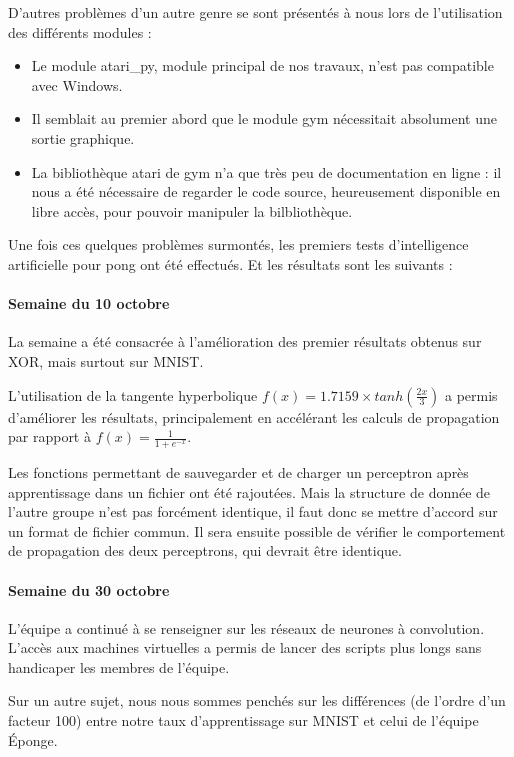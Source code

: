 \documentclass[
    10pt,
    a4paper,
    oneside,
    headinclude,footinclude,
    BCOR=5mm,
    captions=tableabove
]{scrartcl}
\begin{document}
D'autres problèmes d'un autre genre se sont présentés à nous lors de l'utilisation des différents modules :
\begin{itemize}
	\item Le module atari\_py, module principal de nos travaux, n'est pas compatible avec Windows.
	\item Il semblait au premier abord que le module gym nécessitait absolument une sortie graphique.
	\item La bibliothèque atari de gym n'a que très peu de documentation en ligne : il nous a été nécessaire de regarder le code source, heureusement disponible en libre accès, pour pouvoir manipuler la bilbliothèque.
\end{itemize}

	
Une fois ces quelques problèmes surmontés, les premiers tests d'intelligence artificielle pour pong ont été effectués. Et les résultats sont les suivants :

\paragraph{Semaine du 10 octobre}

La semaine a été consacrée à l'amélioration des premier résultats obtenus sur XOR, mais surtout sur MNIST.

L'utilisation de la tangente hyperbolique $f(x) = 1.7159 \times tanh(\frac{2x}{3})$ a permis d'améliorer les résultats, principalement en accélérant les calculs de propagation par rapport à $f(x) = \frac{1}{1 + e^{-x}}$.

Les fonctions permettant de sauvegarder et de charger un perceptron après apprentissage dans un fichier ont été rajoutées. Mais la structure de donnée de l'autre groupe n'est pas forcément identique, il faut donc se mettre d'accord sur un format de fichier commun. Il sera ensuite possible de vérifier le comportement de propagation des deux perceptrons, qui devrait être identique.

\paragraph{Semaine du 30 octobre}

L'équipe a continué à se renseigner sur les réseaux de neurones à convolution. L'accès aux machines virtuelles a permis de lancer des scripts plus longs sans handicaper les membres de l'équipe.

Sur un autre sujet, nous nous sommes penchés sur les différences (de l'ordre d'un facteur 100) entre notre taux d'apprentissage sur MNIST et celui de l'équipe Éponge.
\end{document}
